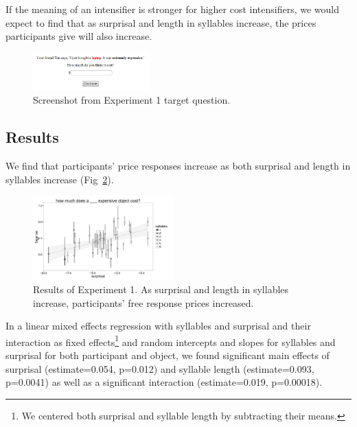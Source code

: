 \documentclass[10pt,letterpaper]{article}
\begin{document}
If the meaning of an intensifier is stronger for higher cost intensifiers, we would expect to find that as surprisal and length in syllables increase, the prices participants give will also increase.

\begin{figure}[ht]
\begin{center}
\includegraphics[width=0.4\textwidth]{analysis_files_for_writeup/images/exp1-q.png}
\end{center}
\caption{Screenshot from Experiment 1 target question.} 
\label{exp1-q}
\end{figure}

\subsection{Results}

We find that participants' price responses increase as both surprisal and length in syllables increase (Fig~\ref{exp1-plot}).

\begin{figure}[ht]
\begin{center}
\includegraphics[width=0.48\textwidth]{analysis_files_for_writeup/images/exp1-plot.png}
\end{center}
\caption{Results of Experiment 1. As surprisal and length in syllables increase, participants' free response prices increased.} 
\label{exp1-plot}
\end{figure}

In a linear mixed effects regression with syllables and surprisal and their interaction as fixed effects\footnote{We centered both surprisal and syllable length by subtracting their means.} and random intercepts and slopes for syllables and surprisal for both participant and object, we found significant main effects of surprisal (estimate=0.054, p=0.012) and syllable length  (estimate=0.093, p=0.0041) as well as a significant interaction (estimate=0.019, p=0.00018).
\end{document}
